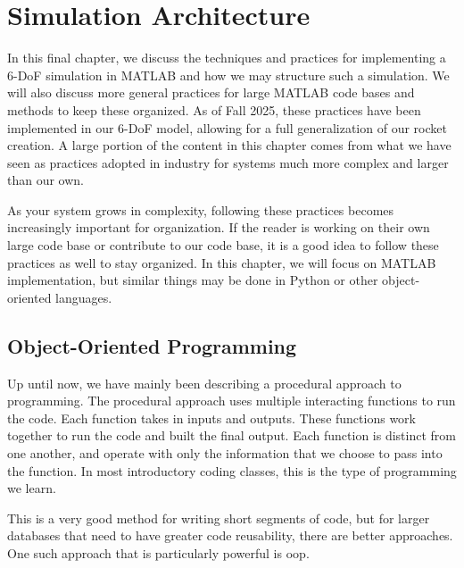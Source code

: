\documentclass[10pt, openany, titlepage]{book}
\theoremstyle{definition}
\begin{document}
\newpage
\printendnotes[large]

\chapter{Simulation Architecture}\label{sec:MATLAB Practices}
In this final chapter, we discuss the techniques and practices for implementing a 6-DoF simulation in MATLAB and how we may structure such a simulation. We will also discuss more general practices for large MATLAB code bases and methods to keep these organized. As of Fall 2025, these practices have been implemented in our 6-DoF model, allowing for a full generalization of our rocket creation. A large portion of the content in this chapter comes from what we have seen as practices adopted in industry for systems much more complex and larger than our own.

As your system grows in complexity, following these practices becomes increasingly important for organization. If the reader is working on their own large code base or contribute to our code base, it is a good idea to follow these practices as well to stay organized. In this chapter, we will focus on MATLAB implementation, but similar things may be done in Python or other object-oriented languages.

\section{Object-Oriented Programming}

\color{black}

Up until now, we have mainly been describing a procedural approach to programming. The procedural approach uses multiple interacting functions to run the code. Each function takes in inputs and outputs. These functions work together to run the code and built the final output. Each function is distinct from one another, and operate with only the information that we choose to pass into the function. In most introductory coding classes, this is the type of programming we learn.

This is a very good method for writing short segments of code, but for larger databases that need to have greater code reusability, there are better approaches. One such approach that is particularly powerful is \gls{oop}. 
\end{document}
